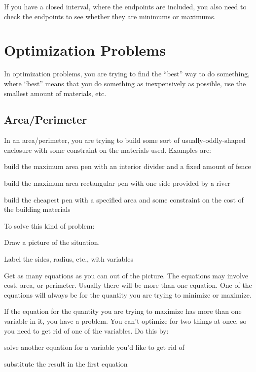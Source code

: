 \documentclass[fleqn]{exam}
\begin{document}
If you have a closed interval, where the endpoints are included, you also need to check the endpoints to see whether
they are minimums or maximums.

\section{Optimization Problems}
In optimization problems, you are trying to find the ``best'' way to do something, where ``best'' means that you do
something as inexpensively as possible, use the smallest amount of materials, etc.

\subsection{Area/Perimeter}

In an area/perimeter, you are trying to build some sort of usually-oddly-shaped enclosure with some constraint on the
materials used.  Examples are:

\begin{itemize*}
\item build the maximum area pen with an interior divider and a fixed amount of fence
\item build the maximum area rectangular pen with one side provided by a river
\item build the cheapest pen with a specified area and some constraint on the cost of the building materials
\end{itemize*}

To solve this kind of problem:
\begin{itemize*}
\item Draw a picture of the situation.  
\item Label the sides, radius, etc., with variables
\item Get as many equations as you can out of the picture.  The equations may involve cost, area, or perimeter.  Usually
  there will be more than one equation.  One of the equations will always be for the quantity you are trying to minimize
  or maximize.

\item If the equation for the quantity you are trying to maximize has more than one variable in it, you have a problem.
  You can't optimize for two things at once, so you need to get rid of one of the variables.  Do this by:
  \begin{itemize*}
    \item solve another equation for a variable you'd like to get rid of
    \item substitute the result in the first equation  
  \end{itemize*}

\end{itemize*}
\end{document}
